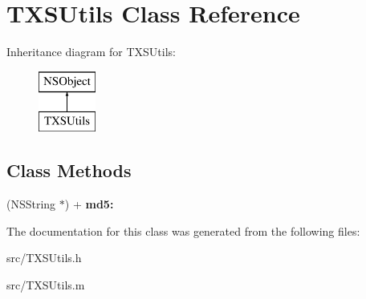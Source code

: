 \hypertarget{interface_t_x_s_utils}{}\section{T\+X\+S\+Utils Class Reference}
\label{interface_t_x_s_utils}
Inheritance diagram for T\+X\+S\+Utils\+:\begin{figure}[H]
\begin{center}
\leavevmode
\includegraphics[height=2.000000cm]{interface_t_x_s_utils}
\end{center}
\end{figure}
\subsection*{Class Methods}
\begin{DoxyCompactItemize}
\item 
\hypertarget{interface_t_x_s_utils_a322bbc20c6af5de0ee7eede1d1d2cc53}{}(N\+S\+String $\ast$) + {\bfseries md5\+:}\label{interface_t_x_s_utils_a322bbc20c6af5de0ee7eede1d1d2cc53}

\end{DoxyCompactItemize}


The documentation for this class was generated from the following files\+:\begin{DoxyCompactItemize}
\item 
src/T\+X\+S\+Utils.\+h\item 
src/T\+X\+S\+Utils.\+m\end{DoxyCompactItemize}
